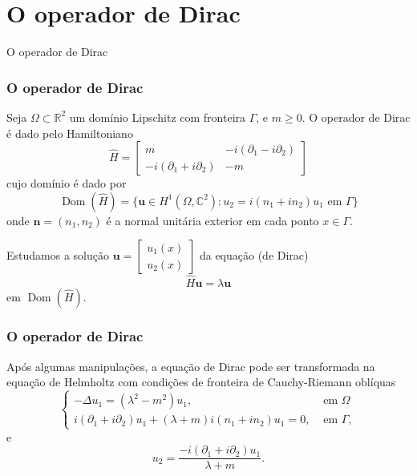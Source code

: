 \documentclass[portuguese,notheorems]{beamer}
\DeclareMathOperator{\dom}{Dom}
\begin{document}
\section{O operador de Dirac}
\begin{frame}
    \centering
    \LARGE
    O operador de Dirac
\end{frame}

\begin{frame}\frametitle{O operador de Dirac}
    Seja \(\Omega \subset \mathbb{R}^2\) um domínio Lipschitz com fronteira \(\Gamma\), e \(m \geq 0\). O operador de Dirac é dado pelo Hamiltoniano
    \begin{equation}
        \hat{H}=\begin{bmatrix}
        m & -i(\partial_1 - i \partial_2)\\
        -i(\partial_1 + i \partial_2) & -m
    \end{bmatrix}
\end{equation}
cujo domínio é dado por
\[
\dom(\hat{H}) = \{\mathbf{u} \in H^1(\Omega, \mathbb{C}^2): u_2 = i(n_1+i n_2)u_1 \text{ em } \Gamma\}
\]
onde $\mathbf{n}=(n_1,n_2)$ é a normal unitária exterior em cada ponto $x \in \Gamma$.

\pause
    Estudamos a solução \(\mathbf{u} = \begin{bmatrix} u_1(x) \\ u_2(x)\end{bmatrix}\) da equação (de Dirac)
    \[
        \hat{H}\mathbf{u} = \lambda \mathbf{u}
    \]
    em \(\dom(\hat{H})\).
\end{frame}

\begin{frame}\frametitle{O operador de Dirac}
    Após algumas manipulações, a equação de Dirac pode ser transformada na equação de Helmholtz com condições de fronteira de Cauchy-Riemann oblíquas
        \begin{equation}
        \begin{cases}
            -\Delta u_1 = (\lambda^2 - m^2)u_1, & \text{ em } \Omega\\
             i (\partial_1 + i\partial_2)u_1 + (\lambda + m)i(n_1 + i n_2)u_1 = 0, & \text{ em } \Gamma,
        \end{cases}
    \end{equation}
    e
        \[
    u_2 = \frac{-i (\partial_1 + i\partial_2)u_1}{\lambda + m}.
    \]

\end{frame}
\end{document}
